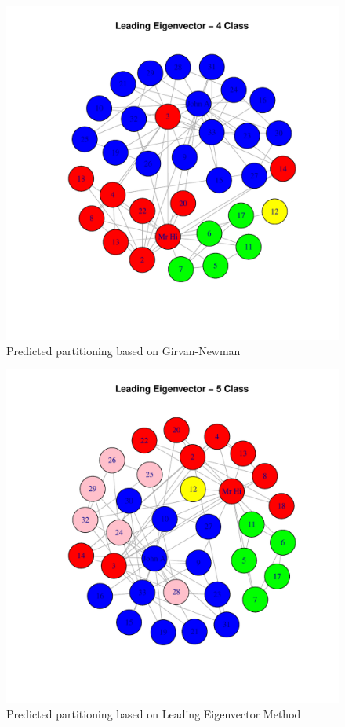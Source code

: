 \begin{figure}[H]
\centering 
\includegraphics[width=.8\textwidth]{../Rplots4.pdf}
\caption{Predicted partitioning based on Girvan-Newman}
\end{figure}

\begin{figure}[H]
\centering 
\includegraphics[width=.8\textwidth]{../Rplots5.pdf}
\caption{Predicted partitioning based on Leading Eigenvector Method}
\end{figure}


